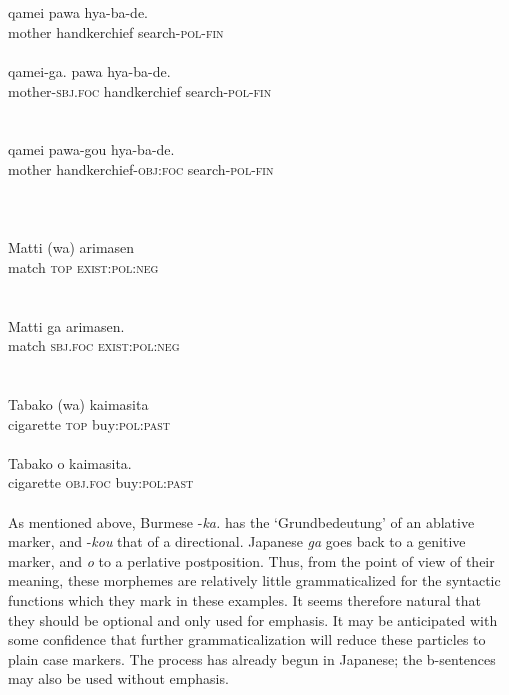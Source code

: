 \ea\label{ex:E101}
 \\
 \ea {}\\
 \gll  qamei  pawa  hya-ba-de.\\
  mother  handkerchief  search-\textsc{pol}-\textsc{fin}\\
\\
\ex
\gll  qamei-ga.  pawa  hya-ba-de.\\
 mother-\textsc{sbj}.\textsc{foc}  handkerchief search-\textsc{pol}-\textsc{fin}\\
\\
\ex {}\\
\gll qamei pawa-gou hya-ba-de.\\
mother handkerchief-\textsc{obj}:\textsc{foc}  search-\textsc{pol}-\textsc{fin}\\
\\
\z
\z
\noindent \ea\label{ex:E102}
\langinfo{\LangJap}{}{}  \\
 \ea {}\\
 \gll  Matti  (wa)  arimasen\\
 match  \textsc{top}  \textsc{exist}:\textsc{pol}:\textsc{neg}\\
\\
\ex {}\\
\gll  Matti  ga  arimasen.\\
 match  \textsc{sbj}.\textsc{foc} \textsc{exist}:\textsc{pol}:\textsc{neg}\\
\\
\z
\z
\noindent \ea\label{ex:E103}
\\
 \ea
 \gll  Tabako  (wa)  kaimasita\\
   cigarette  \textsc{top}  buy:\textsc{pol}:\textsc{past}\\
\\
\ex
\gll  Tabako  o  kaimasita.\\
  cigarette  \textsc{obj}.\textsc{foc}  buy:\textsc{pol}:\textsc{past}\\
\\
\z
\z
\noindent As mentioned above, Burmese -\textit{ka.} has the ‘Grundbedeutung’ of an ablative marker, and -\textit{kou} that of a directional. Japanese \textit{ga} goes back to a genitive marker, and \textit{o} to a perlative postposition. Thus, from the point of view of their meaning, these morphemes are relatively little grammaticalized for the syntactic functions which they mark in these examples. It seems therefore natural that they should be optional and only used for emphasis. It may be anticipated with some confidence that further grammaticalization will reduce these particles to plain case markers. The process has already begun in Japanese; the b-sentences may also be used without emphasis.

